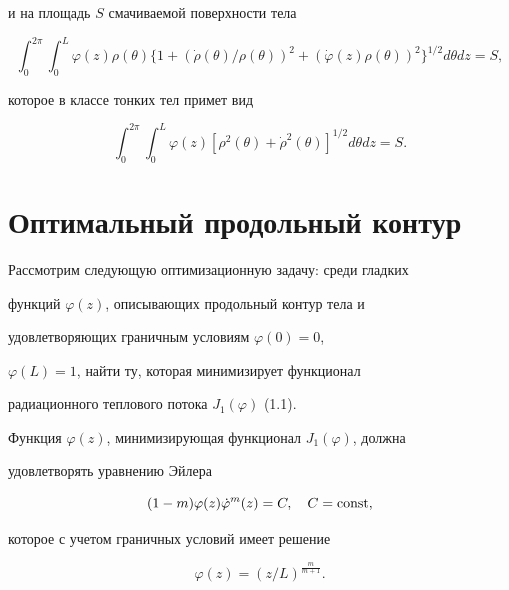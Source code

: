 и на площадь $S$ смачиваемой поверхности тела


$$


\int_0^{2 \pi} \int_0^L


\varphi (z) \rho (\theta)


\{ 1 + ( \Dot{\rho} (\theta) / \rho(\theta) )^2 +


(\Dot{\varphi} (z) \rho (\theta))^2


\}^{1/2} d\theta dz= S,


$$


которое в классе тонких тел примет вид


\begin{equation}


\int_0^{2 \pi} \int_0^L


\varphi (z) [ \rho^2 (\theta) + \Dot{\rho}^2 (\theta)


]^{1/2} d\theta dz = S.


\end{equation}





\section{Оптимальный продольный контур}





Рассмотрим следующую оптимизационную задачу: среди гладких


функций $\varphi (z)$, описывающих продольный контур тела и


удовлетворяющих граничным условиям $ \varphi (0) = 0$,


$\varphi (L) = 1$, найти ту, которая минимизирует функционал


радиационного теплового потока $J_1 (\varphi)$ (1.1).





Функция $\varphi (z)$, минимизирующая функционал $J_1 (\varphi)$, должна


удовлетворять уравнению Эйлера


$$


(1 - m) \varphi (z) \Dot{\varphi}^m (z) = C, \quad


C = \const,


$$


которое с учетом граничных условий имеет решение


\begin{equation}


\varphi (z) = (z / L)^{\frac {m}{m+1}}.


\end{equation}


